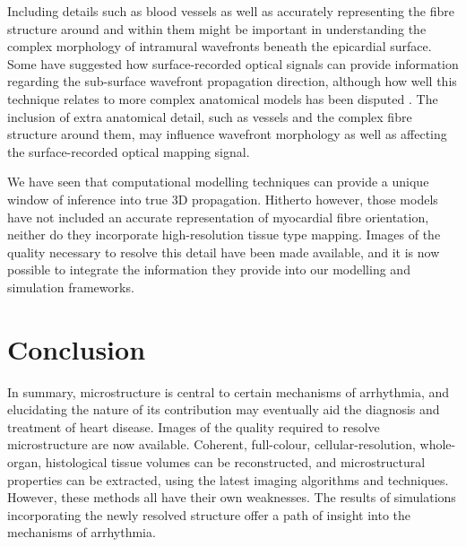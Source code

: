   Including details such as blood vessels as well as accurately representing the fibre structure around and within them might be important in understanding the complex morphology of intramural wavefronts beneath the epicardial surface. Some \cite{Ding2001,Hyatt2003} have suggested how surface-recorded optical signals can provide information regarding the sub-surface wavefront propagation direction, although how well this technique relates to more complex anatomical models has been disputed \cite{Bishop2006}. The inclusion of extra anatomical detail, such as vessels and the complex fibre structure around them, may influence wavefront morphology as well as affecting the surface-recorded optical mapping signal.
  
  We have seen that computational modelling techniques can provide a unique window of inference into true 3D propagation. Hitherto however, those models have not included an accurate representation of myocardial fibre orientation, neither do they incorporate high-resolution tissue type mapping. Images of the quality necessary to resolve this detail have been made available, and it is now possible to integrate the information they provide into our modelling and simulation frameworks.

\section{Conclusion} %
\label{sec:conclusion}
  In summary, microstructure is central to certain mechanisms of arrhythmia, and elucidating the nature of its contribution may eventually aid the diagnosis and treatment of heart disease. Images of the quality required to resolve microstructure are now available. Coherent, full-colour, cellular-resolution, whole-organ, histological tissue volumes can be reconstructed, and microstructural properties can be extracted, using the latest imaging algorithms and techniques. However, these methods all have their own weaknesses. The results of simulations incorporating the newly resolved structure offer a path of insight into the mechanisms of arrhythmia.
